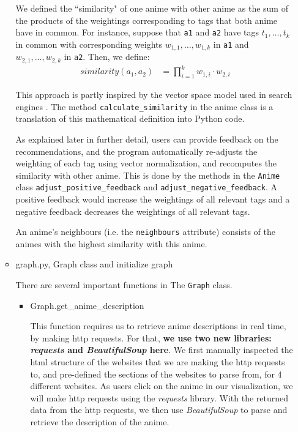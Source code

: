 \documentclass[12pt]{article}
\begin{document}
\begin{enumerate}
\begin{text}
\begin{itemize}
    We defined the ``similarity" of one anime with other anime as the sum of the products of the weightings corresponding to tags that both anime have in common. For instance, suppose that \texttt{a1} and \texttt{a2} have tags $t_1, \ldots, t_k$ in common with corresponding weights $w_{1,1}, \ldots, w_{1,k}$ in \texttt{a1} and $w_{2,1}, \ldots, w_{2,k}$ in \texttt{a2}. Then, we define:
    \begin{align*}
        similarity(a_1, a_2) &= \prod_{i=1}^k w_{1, i} \cdot w_{2, i}
    \end{align*}
    
    This approach is partly inspired by the vector space model used in search engines \citep{vspace}. The method \texttt{calculate\_similarity} in the anime class is a translation of this mathematical definition into Python code.
    
    As explained later in further detail, users can provide feedback on the recommendations, and the program automatically re-adjusts the weighting of each tag using vector normalization, and recomputes the similarity with other anime. This is done by the methods in the \texttt{Anime} class \texttt{adjust\_positive\_feedback} and \texttt{adjust\_negative\_feedback}. A positive feedback would increase the weightings of all relevant tags and a negative feedback decreases the weightings of all relevant tags.
    
    An anime's neighbours (i.e. the \texttt{neighbours} attribute) consists of the animes with the highest similarity with this anime.
    
    \item graph.py, Graph class and initialize graph

    There are several important functions in The \texttt{Graph} class.
    
    \begin{itemize}
        \item Graph.get\_anime\_description
        
            This function requires us to retrieve anime descriptions in real time, by making http requests. For that, \textbf{we use two new libraries: \textit{requests} and \textit{BeautifulSoup} here}. We first manually inspected the html structure of the websites that we are making the http requests to, and pre-defined the sections of the websites to parse from, for 4 different websites. As users click on the anime in our visualization, we will make http requests using the \textit{requests} library. With the returned data from the http requests, we then use \textit{BeautifulSoup} to parse and retrieve the description of the anime.
            

\end{itemize}
\end{itemize}
\end{text}
\end{enumerate}
\end{document}
